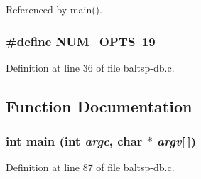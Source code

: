 Referenced by main().\hypertarget{bin_2baltsp-db_8c_9b58b2c4af931c8486a986c9deca40f5}{
\subsubsection[{NUM\_\-OPTS}]{\setlength{\rightskip}{0pt plus 5cm}\#define NUM\_\-OPTS~19}}
\label{bin_2baltsp-db_8c_9b58b2c4af931c8486a986c9deca40f5}




Definition at line 36 of file baltsp-db.c.

\subsection{Function Documentation}
\hypertarget{bin_2baltsp-db_8c_0ddf1224851353fc92bfbff6f499fa97}{
\subsubsection[{main}]{\setlength{\rightskip}{0pt plus 5cm}int main (int {\em argc}, \/  char $\ast$ {\em argv}\mbox{[}$\,$\mbox{]})}}
\label{bin_2baltsp-db_8c_0ddf1224851353fc92bfbff6f499fa97}




Definition at line 87 of file baltsp-db.c.


